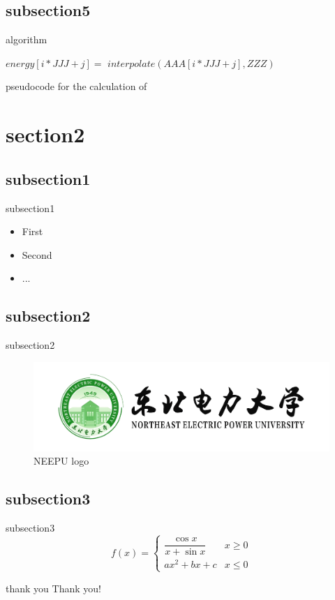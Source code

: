 \documentclass[UTF8,11pt]{beamer}
\begin{document}
\subsection{subsection5}
\begin{frame}{algorithm}
	\begin{algorithm}[H]
	\begin{algorithmic}[1]
	\STATE $energy[i*JJJ+j] =$ 
	$ interpolate(AAA[i*JJJ+j], ZZZ)$
	\ENDFOR
	\ENDFOR
	\end{algorithmic}
	\caption{pseudocode for the calculation of }
	\label{alg:seq}
	\end{algorithm}
\end{frame}




\section{section2}
\subsection{subsection1}
\begin{frame}{subsection1}
	\begin{itemize}[<+->]
		\item First
		\item Second
		\item ...
	\end{itemize}
\end{frame}

\subsection{subsection2}
\begin{frame}{subsection2}
	\begin{figure}[htbp]
		\includegraphics[scale=0.1]{figure/neepu_logo}
		\caption{NEEPU logo}
	\end{figure}
\end{frame}


\subsection{subsection3}
\begin{frame}{subsection3}
	\begin{equation}
	f(x) = 
	\begin{cases}
	\dfrac{\cos{x}}{x+\sin{x}} & x \geq 0 \\
	ax^2+bx+c & x \leq 0
	\end{cases}
	\end{equation}
\end{frame}


\begin{frame}{thank you}
	\centering \calligra {} Thank you!
\end{frame}
\end{document}
